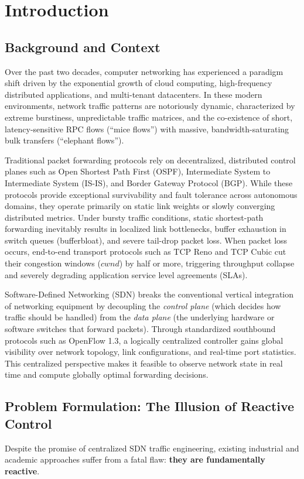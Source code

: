 \chapter{Introduction}
\label{ch:intro}

\section{Background and Context}
Over the past two decades, computer networking has experienced a paradigm shift driven by the exponential growth of cloud computing, high-frequency distributed applications, and multi-tenant datacenters. In these modern environments, network traffic patterns are notoriously dynamic, characterized by extreme burstiness, unpredictable traffic matrices, and the co-existence of short, latency-sensitive RPC flows (``mice flows'') with massive, bandwidth-saturating bulk transfers (``elephant flows'').

Traditional packet forwarding protocols rely on decentralized, distributed control planes such as Open Shortest Path First (OSPF), Intermediate System to Intermediate System (IS-IS), and Border Gateway Protocol (BGP). While these protocols provide exceptional survivability and fault tolerance across autonomous domains, they operate primarily on static link weights or slowly converging distributed metrics. Under bursty traffic conditions, static shortest-path forwarding inevitably results in localized link bottlenecks, buffer exhaustion in switch queues (bufferbloat), and severe tail-drop packet loss. When packet loss occurs, end-to-end transport protocols such as TCP Reno and TCP Cubic cut their congestion windows ($cwnd$) by half or more, triggering throughput collapse and severely degrading application service level agreements (SLAs).

Software-Defined Networking (SDN) breaks the conventional vertical integration of networking equipment by decoupling the \textit{control plane} (which decides how traffic should be handled) from the \textit{data plane} (the underlying hardware or software switches that forward packets). Through standardized southbound protocols such as OpenFlow 1.3, a logically centralized controller gains global visibility over network topology, link configurations, and real-time port statistics. This centralized perspective makes it feasible to observe network state in real time and compute globally optimal forwarding decisions.

\section{Problem Formulation: The Illusion of Reactive Control}
Despite the promise of centralized SDN traffic engineering, existing industrial and academic approaches suffer from a fatal flaw: \textbf{they are fundamentally reactive}. 

